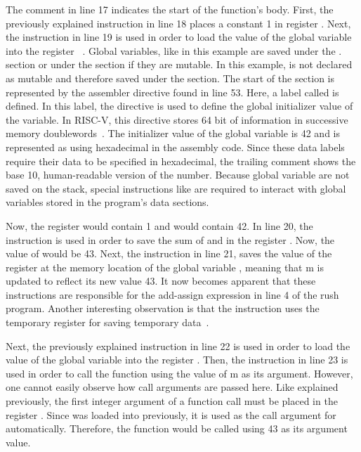 The comment in line 17 indicates the start of the function's body.
First, the previously explained  instruction in line 18 places a constant 1 in register .
Next, the  instruction in line 19 is used in order to load the value of the global variable  into the register ~\cite[reference]{Patterson2017}.
Global variables, like  in this example are saved under the . section or under the  section if they are mutable.
In this example,  is not declared as mutable and therefore saved under the  section.
The start of the  section is represented by the  assembler directive found in line 53.
Here, a label called  is defined.
In this label, the  directive is used to define the global initializer value of the variable.
In RISC-V, this directive stores 64 bit of information in successive memory doublewords~\cite[p.~39]{Patterson2017}.
The initializer value of the global variable is 42 and is represented as  using hexadecimal in the assembly code.
Since these data labels require their data to be specified in hexadecimal, the trailing comment shows the base 10, human-readable version of the number.
Because global variable are not saved on the stack, special instructions like  are required to interact with global variables stored in the program's data sections.

Now, the register  would contain 1 and  would contain 42.
In line 20, the  instruction is used in order to save the sum of  and  in the register .
Now, the value of  would be 43.
Next, the  instruction in line 21, saves the value of the register  at the memory location of the global variable , meaning that m is updated to reflect its new value 43.
It now becomes apparent that these instructions are responsible for the add-assign expression in line 4 of the rush program.
Another interesting observation is that the  instruction uses the temporary register  for saving temporary data~\cite[reference]{Patterson2017}.

Next, the previously explained  instruction in line 22 is used in order to load the value of the global variable into the register .
Then, the  instruction in line 23 is used in order to call the  function using the value of m as its argument.
However, one cannot easily observe how call arguments are passed here.
Like explained previously, the first integer argument of a function call must be placed in the register .
Since  was loaded into  previously, it is used as the call argument for  automatically.
Therefore, the  function would be called using 43 as its argument value.

